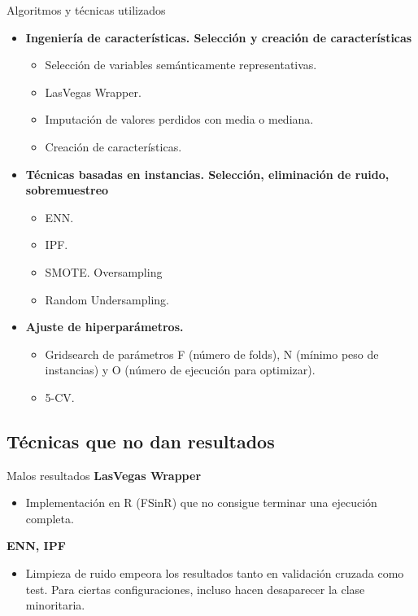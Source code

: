 \begin{frame}{Algoritmos y técnicas utilizados}
	\begin{itemize}
		\item \textbf{Ingeniería de características. Selección y creación de características}
			\begin{itemize}
				\item Selección de variables semánticamente representativas. 
				\item LasVegas Wrapper. 
				\item Imputación de valores perdidos con media o mediana.
				\item Creación de características. \pause 
			\end{itemize}
		\item \textbf{Técnicas basadas en instancias. Selección, eliminación de ruido, sobremuestreo}
			\begin{itemize}
				\item ENN.
				\item IPF.
				\item SMOTE. Oversampling
				\item Random Undersampling. \pause 
			\end{itemize}
		\item \textbf{Ajuste de hiperparámetros.}
			\begin{itemize}
				\item Gridsearch de parámetros F (número de folds), N (mínimo peso de instancias) y O (número de ejecución para optimizar).
				\item 5-CV.
			\end{itemize}
	\end{itemize}
\end{frame}
\subsection{Técnicas que no dan resultados}
\begin{frame}{Malos resultados}
	\textbf{LasVegas Wrapper}
	\begin{itemize}
		\item Implementación en R (FSinR) que no consigue terminar una ejecución completa. \pause
	\end{itemize}
	\textbf{ENN, IPF}
	\begin{itemize}
		\item Limpieza de ruido empeora los resultados tanto en validación cruzada como test. Para ciertas configuraciones, incluso hacen desaparecer la clase minoritaria. 
	\end{itemize}
\end{frame}

